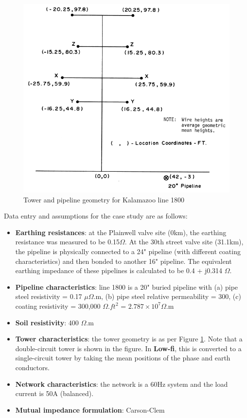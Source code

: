 \documentclass{article}
\begin{document}
\begin{figure}[!htp]
\begin{center}
\caption{Tower and pipeline geometry for Kalamazoo line 1800 \cite{EPRI_1978}}
\label{fig:kalamazoo_geo}
\includegraphics[width=0.8\linewidth]{./Figures/kalamazoo_geo.png}
\end{center}
\end{figure}

Data entry and assumptions for the case study are as follows:
\begin{itemize}
\item \textbf{Earthing resistances}: at the Plainwell valve site (0km), the earthing resistance was measured to be 0.15$\Omega$. At the 30th street valve site (31.1km), the pipeline is physically connected to a 24" pipeline (with different coating characteristics) and then bonded to another 16" pipeline. The equivalent earthing impedance of these pipelines is calculated to be 0.4 + j0.314 $\Omega$.
\item \textbf{Pipeline characteristics}: line 1800 is a 20" buried pipeline with (a) pipe steel resistivity = 0.17 $\mu\Omega$.m, (b) pipe steel relative permeability = 300, (c) coating resistivity = 300,000 $\Omega.ft^{2}$ = $2.787 \times 10^{7} \Omega$.m
\item \textbf{Soil resistivity}: 400 $\Omega$.m
\item \textbf{Tower characteristics}: the tower geometry is as per Figure \ref{fig:kalamazoo_geo}. Note that a double-circuit tower is shown in the figure. In \textbf{Low-fi}, this is converted to a single-circuit tower by taking the mean positions of the phase and earth conductors.
\item \textbf{Network characteristics}: the network is a 60Hz system and the load current is 50A (balanced).
\item \textbf{Mutual impedance formulation}: Carson-Clem
\end{itemize}
\end{document}
